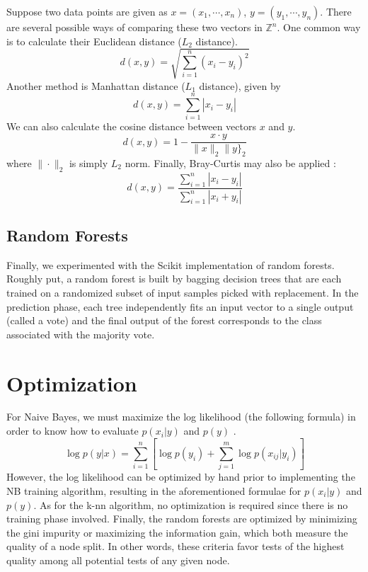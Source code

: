 \documentclass{acm_proc_article-sp}
\begin{document}
Suppose two data points are given as $x=(x_1, \cdots, x_n)$, $y=(y_1, \cdots, y_n)$. There are several possible ways of comparing these two vectors in $\mathbb{Z}^n$. One common way is to calculate their Euclidean distance ($L_2$ distance).
\begin{equation}
d(x,y) = \sqrt{\sum_{i=1}^{n} (x_i - y_i)^2} \label{eq:euclidean}
\end{equation}
Another method is Manhattan distance ($L_1$ distance), given by 
\begin{equation}
d(x,y) = \sum_{i=1}^{n} | x_i - y_i | \label{eq:manhattan}
\end{equation}
We can also calculate the cosine distance between vectors $x$ and $y$. 
\begin{equation}
d(x,y) = 1 - \frac{x \cdot y}{ \| x \|_2  \| y \}_2} \label{eq:cosine}
\end{equation}
where $\| \cdot \|_2$ is simply $L_2$ norm.
Finally, Bray-Curtis may also be applied :
\begin{equation}
d(x,y) =\frac{ \sum_{i=1}^n  |x_i - y_i|}{ \sum_{i=1}^n  |x_i + y_i|} \label{eq:braycurtis}
\end{equation}

\subsection{Random Forests}
Finally, we experimented with the Scikit implementation of random forests. Roughly put, a random forest is built by bagging decision trees that are each trained on a randomized subset of input samples picked with replacement. In the prediction phase, each tree independently  fits an input vector to a single output (called a vote) and the final output of the forest corresponds to the class associated with the majority vote.

\section{Optimization}
For Naive Bayes, we must maximize the log likelihood (the following formula) in order to know how to evaluate $p(x_i|y)$ and $p(y)$ \cite{pineaul5}. 
\begin{equation}
\log p(y | x) = \sum_{i=1}^n [\log p(y_i) + \sum_{j=1}^m \log p(x_{ij} | y_i)] \label{eq:log}
\end{equation}
However, the log likelihood can be optimized by hand prior to implementing the NB training algorithm, resulting in the aforementioned formulae for $p(x_i|y)$ and $p(y)$. As for the k-nn algorithm, no optimization is required since there is no training phase involved. Finally, the random forests are optimized by minimizing the gini impurity or maximizing the information gain, which both measure the quality of a node split. In other words, these criteria favor tests of the highest quality among all potential tests of any given node.
\end{document}
